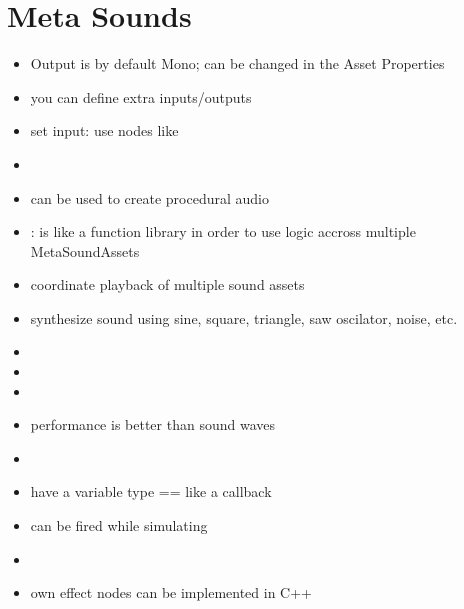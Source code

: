     \section{Meta Sounds}
        \begin{itemize}
            \item Output is by default Mono; can be changed in the Asset Properties
            \item you can define extra inputs/outputs
            \item set input: use nodes like 
            \item 
            \item can be used to create procedural audio
            \item {}: is like a function library in order to use logic accross multiple MetaSoundAssets
            \item coordinate playback of multiple sound assets
            \item synthesize sound using sine, square, triangle, saw oscilator, noise, etc.
            \item 
            \item 
            \item 
            \item performance is better than sound waves
            \item 
            \item have a variable type  == like a callback
            \item can be fired while simulating
            \item 
            \item own effect nodes can be implemented in C++
        \end{itemize}

